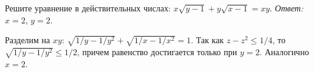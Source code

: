 \problem
Решите уравнение в действительных числах:
$x \sqrt{y - 1} + y \sqrt{x - 1} = x y$.
\solution
\emph{Ответ:} $x = 2$, $y = 2$.
\par
Разделим на $x y$:
$\sqrt{1 / y - 1 / y^2} + \sqrt{1 / x - 1 / x^2} = 1$.
Так как $z - z^2 \leq 1 / 4$, то $\sqrt{1 / y - 1 / y^2} \leq 1 / 2$, причем
равенство достигается только при $y = 2$.
Аналогично $x = 2$.
\endproblem

